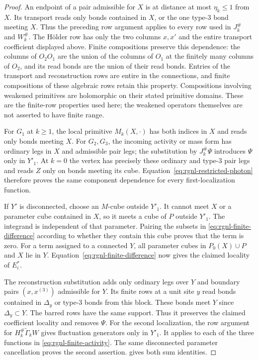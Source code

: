 \documentclass[11pt,letterpaper,reqno]{amsart}
\begin{document}
\begin{proof}
An endpoint of a pair admissible for $X$ is at distance
at most $\eta_k\le1$ from $X$. Its transport reads only
bonds contained in $X$, or the one type-$3$ bond meeting $X$.
Thus the preceding row argument applies to every row
used in $J_k^\#$ and $W_k^\#$.
The H\"older row has only the two columns $x,x'$ and
the entire transport coefficient displayed above.
Finite compositions preserve this dependence: the columns
of $O_2O_1$ are the union of the columns of $O_1$ at the
finitely many columns of $O_2$, and its read bonds are the
union of their read bonds. Entries of the transport and
reconstruction rows are entire in the connections, and finite
compositions of these algebraic rows retain this property.
Compositions involving weakened primitives are holomorphic
on their stated primitive domains. These are the finite-row
properties used here; the weakened operators themselves
are not asserted to have finite range.

For $G_1$ at $k\ge1$, the local primitive $M_k(X,\cdot)$
has both indices in $X$ and reads only bonds meeting $X$.
For $G_2,G_3$, the incoming activity or mass form has ordinary
legs in $X$ and admissible pair legs; the substitution by
$J_k^\#\Psi$ introduces $\Psi$ only in $Y'_1$.
At $k=0$ the vertex has precisely these ordinary and
type-$3$ pair legs and reads $Z$ only on bonds meeting
its cube. Equation~\eqref{eq:rgnl-restricted-photon}
therefore proves the same component dependence for every
first-localization function.

If $Y'$ is disconnected, choose an $M$-cube outside $Y'_1$.
It cannot meet $X$ or a parameter cube contained in $X$,
so it meets a cube of $P$ outside $Y'_1$. The integrand is
independent of that parameter. Pairing the subsets in
\eqref{eq:rgnl-finite-difference} according to whether they
contain this cube proves that the term is zero.
For a term assigned to a connected $Y$, all parameter cubes
in $P_0(X)\cup P$ and $X$ lie in $Y$.
Equation~\eqref{eq:rgnl-finite-difference} now gives the
claimed locality of $E_i^*$.

The reconstruction substitution adds only ordinary legs
over $Y$ and boundary pairs $(x,x^{(3)})$ admissible for
$Y$. Its finite rows at a unit site $y$ read bonds contained
in $\Delta_y$ or type-$3$ bonds from this block. These bonds
meet $Y$ since $\Delta_y\subset Y$. The barred rows have
the same support. Thus it preserves the claimed coefficient
locality and removes $\Psi$.
For the second localization, the row argument for
$H_k^\#\widetilde\Gamma_kW$ gives fluctuation generators
only in $Y'_1$. It applies to each of the three functions
in \eqref{eq:rgnl-finite-activity}. The same disconnected
parameter cancellation proves the second assertion.
 gives both sum identities.


\end{proof}
\end{document}
